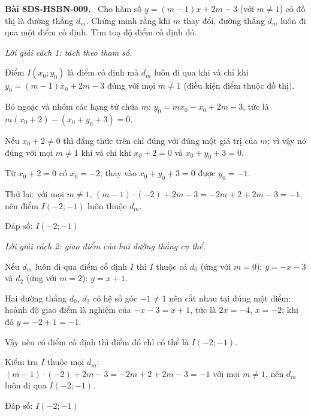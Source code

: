 \documentclass[12pt,a4paper]{article}
\newenvironment{problem}[1][]{\par\medskip\noindent\textbf{Bài #1.}\ }{\par}
\newenvironment{solution}[1][]{\par\noindent\textit{Lời giải #1.}\par}{\par}
\begin{document}
\begin{problem}[8DS-HSBN-009]
Cho hàm số $y = (m - 1)x + 2m - 3$ (với $m \neq 1$) có đồ thị là đường thẳng $d_m$. Chứng minh rằng khi $m$ thay đổi, đường thẳng $d_m$ luôn đi qua một điểm cố định. Tìm toạ độ điểm cố định đó.

\begin{solution}[cách 1: tách theo tham số]
Điểm $I(x_0; y_0)$ là điểm cố định mà $d_m$ luôn đi qua khi và chỉ khi $y_0 = (m - 1)x_0 + 2m - 3$ đúng với mọi $m \neq 1$ (điều kiện điểm thuộc đồ thị).

Bỏ ngoặc và nhóm các hạng tử chứa $m$: $y_0 = mx_0 - x_0 + 2m - 3$, tức là $m(x_0 + 2) - (x_0 + y_0 + 3) = 0$.

Nếu $x_0 + 2 \neq 0$ thì đẳng thức trên chỉ đúng với đúng một giá trị của $m$; vì vậy nó đúng với mọi $m \neq 1$ khi và chỉ khi $x_0 + 2 = 0$ và $x_0 + y_0 + 3 = 0$.

Từ $x_0 + 2 = 0$ có $x_0 = -2$; thay vào $x_0 + y_0 + 3 = 0$ được $y_0 = -1$.

Thử lại: với mọi $m \neq 1$, $(m - 1) \cdot (-2) + 2m - 3 = -2m + 2 + 2m - 3 = -1$, nên điểm $I(-2; -1)$ luôn thuộc $d_m$.

Đáp số: $\boxed{I(-2; -1)}$
\end{solution}

\begin{solution}[cách 2: giao điểm của hai đường thẳng cụ thể]
Nếu $d_m$ luôn đi qua điểm cố định $I$ thì $I$ thuộc cả $d_0$ (ứng với $m = 0$): $y = -x - 3$ và $d_2$ (ứng với $m = 2$): $y = x + 1$.

Hai đường thẳng $d_0$, $d_2$ có hệ số góc $-1 \neq 1$ nên cắt nhau tại đúng một điểm; hoành độ giao điểm là nghiệm của $-x - 3 = x + 1$, tức là $2x = -4$, $x = -2$; khi đó $y = -2 + 1 = -1$.

Vậy nếu có điểm cố định thì điểm đó chỉ có thể là $I(-2; -1)$.

Kiểm tra $I$ thuộc mọi $d_m$: $(m - 1) \cdot (-2) + 2m - 3 = -2m + 2 + 2m - 3 = -1$ với mọi $m \neq 1$, nên $d_m$ luôn đi qua $I(-2; -1)$.

Đáp số: $\boxed{I(-2; -1)}$
\end{solution}
\end{problem}
\end{document}
